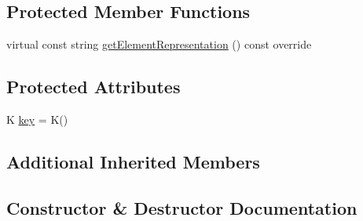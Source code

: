 \subsection*{Protected Member Functions}
\begin{DoxyCompactItemize}
\item 
virtual const string \mbox{\hyperlink{classbridges_1_1datastructure_1_1_b_s_t_element_a8f962a01b6e0eff59abeee7768264fd9}{get\+Element\+Representation}} () const override
\end{DoxyCompactItemize}
\subsection*{Protected Attributes}
\begin{DoxyCompactItemize}
\item 
K \mbox{\hyperlink{classbridges_1_1datastructure_1_1_b_s_t_element_ac1d971f8379c4ce6b956ebd635c88895}{key}} = K()
\end{DoxyCompactItemize}
\subsection*{Additional Inherited Members}


\subsection{Constructor \& Destructor Documentation}
\mbox{\label{classbridges_1_1datastructure_1_1_b_s_t_element_a861caf985c223a9a848082fd5a4974fd}} 

